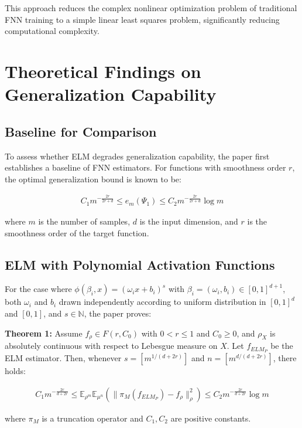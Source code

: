 \documentclass[11pt]{article}
\begin{document}
This approach reduces the complex nonlinear optimization problem of traditional FNN training to a simple linear least squares problem, significantly reducing computational complexity.

\section{Theoretical Findings on Generalization Capability}

\subsection{Baseline for Comparison}

To assess whether ELM degrades generalization capability, the paper first establishes a baseline of FNN estimators. For functions with smoothness order $r$, the optimal generalization bound is known to be:

\begin{align}
C_1 m^{-\frac{2r}{2r+d}} \leq e_m(\Psi_1) \leq C_2 m^{-\frac{2r}{2r+d}} \log m
\end{align}

where $m$ is the number of samples, $d$ is the input dimension, and $r$ is the smoothness order of the target function.

\subsection{ELM with Polynomial Activation Functions}

For the case where $\phi(\beta_i, x) = (\omega_i x + b_i)^s$ with $\beta_i = (\omega_i, b_i) \in [0,1]^{d+1}$, both $\omega_i$ and $b_i$ drawn independently according to uniform distribution in $[0,1]^d$ and $[0,1]$, and $s \in \mathbb{N}$, the paper proves:

\textbf{Theorem 1:} Assume $f_\rho \in F(r, C_0)$ with $0 < r \leq 1$ and $C_0 \geq 0$, and $\rho_X$ is absolutely continuous with respect to Lebesgue measure on $X$. Let $f_{ELM_P}$ be the ELM estimator. Then, whenever $s = [m^{1/(d+2r)}]$ and $n = [m^{d/(d+2r)}]$, there holds:

\begin{align}
C_1 m^{-\frac{2r}{d+2r}} \leq \mathbb{E}_{\rho^m}\mathbb{E}_{\mu^n} \left( \|\pi_M(f_{ELM_P}) - f_\rho\|_\rho^2 \right) \leq C_2 m^{-\frac{2r}{d+2r}} \log m
\end{align}

where $\pi_M$ is a truncation operator and $C_1, C_2$ are positive constants.
\end{document}
